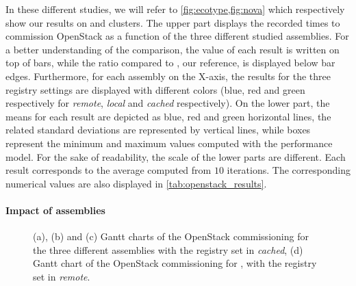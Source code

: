 In these different studies, we will refer to
\cref{fig:ecotype,fig:nova} which respectively show our results on
\ecotype and \nova clusters. The upper part displays the recorded
times to commission OpenStack as a function of the three different
studied assemblies. For a better understanding of the comparison, the
value of each result is written on top of bars, while the ratio
compared to \ansass, our reference, is displayed below bar edges.
Furthermore, for each assembly on the X-axis, the results for the
three \docker registry settings are displayed with different colors
(\ie blue, red and green respectively for \emph{remote}, \emph{local}
and \emph{cached} respectively). On the lower part, the means for each
result are depicted as blue, red and green horizontal lines, the
related standard deviations are represented by vertical lines, while
boxes represent the minimum and maximum values computed with the
performance model.
% 
%
For the sake of readability, the scale of the
lower parts are different. Each result corresponds to the average
computed from $10$ iterations. The corresponding numerical values are
also displayed in \cref{tab:openstack_results}.

\paragraph{Impact of assemblies}

\begin{figure}[t]
  \begin{center}
    \def\svgwidth{\columnwidth}
    \scriptsize
    \def\svgwidth{\columnwidth}
    \scriptsize
    \def\svgwidth{\columnwidth}
    \tiny
    \def\svgwidth{\columnwidth}
    \tiny
    \caption{(a), (b) and (c) Gantt charts of the OpenStack
      commissioning for the three different assemblies with the
      registry set in \emph{cached}, (d) Gantt chart of the OpenStack
      commissioning for \aeoass, with the registry set in
      \emph{remote}.}
  \end{center}
\end{figure}

